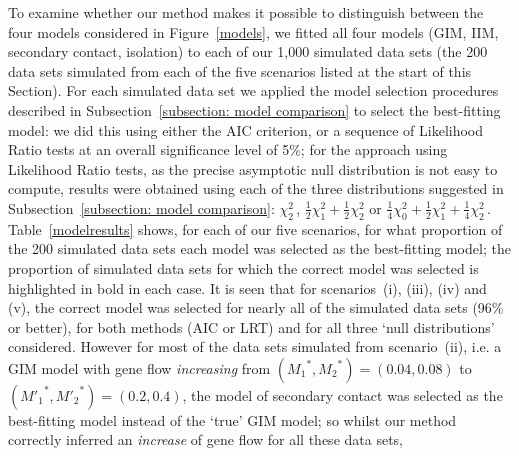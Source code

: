 \documentclass[11pt]{article}
\begin{document}
To examine whether our method makes it possible to distinguish between the four models considered in Figure~\ref{models}, we fitted all four models (GIM, IIM, secondary contact, isolation) to each of our 1,000 simulated data sets (the 200 data sets simulated from each of the five scenarios listed at the start of this Section). For each simulated data set we applied the model selection procedures described in Subsection~\ref{subsection: model comparison} to select the best-fitting model: we did this using either the AIC criterion, or a sequence of Likelihood Ratio tests at an overall significance level of 5\%;
 for the approach using Likelihood Ratio tests, as the precise asymptotic null distribution is not easy to compute, results were obtained using each of the three distributions suggested in Subsection~\ref{subsection: model comparison}: $\chi^2_2$\,, 
$\frac{1}{2} \chi^2_1 +\frac{1}{2} \chi^2_2$ or $\frac{1}{4} \chi^2_0 +\frac{1}{2} \chi^2_1 +\frac{1}{4} \chi^2_2$\,. Table~\ref{modelresults} shows, for each of our five scenarios, for what proportion of the 200 simulated data sets each model was selected as the best-fitting model; the proportion of simulated data sets for which the correct model was selected is highlighted in bold in each case.
It is seen that for scenarios~(i), (iii), (iv) and (v), the correct model was selected for nearly all of the simulated data sets (96\% or better),
for both methods (AIC or LRT) and for all three `null distributions' considered.
 However for most of the data sets simulated from scenario~(ii), i.e. a GIM model 
with gene flow {\em increasing} from 
$({M_1}^{\!*},{M_2}^{\!*})=(0.04,0.08)$ to $({M'_1}^{*},{M'_2}^{*})=(0.2,0.4)$,
the model of secondary contact was selected as the best-fitting model instead of the `true' GIM model; so whilst our method correctly inferred an {\em increase} of gene flow for all these data sets, 
\end{document}
